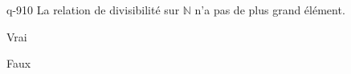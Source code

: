 \begin{truefalse}{q-910}
La relation de divisibilité sur $\mathbb N$ n'a pas de plus grand élément.
\item Vrai
\item* Faux
\end{truefalse}

